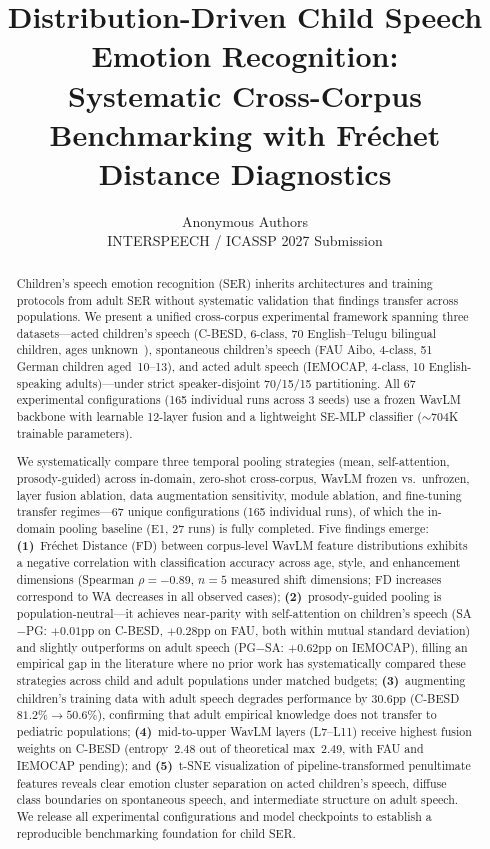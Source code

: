 \documentclass[11pt,a4paper]{article}
\title{Distribution-Driven Child Speech Emotion Recognition:\\
Systematic Cross-Corpus Benchmarking with Fr\'{e}chet Distance Diagnostics}
\author{Anonymous Authors\\
\small INTERSPEECH / ICASSP 2027 Submission}
\date{}
\begin{document}
\maketitle


\begin{abstract}
Children's speech emotion recognition (SER) inherits architectures and training
protocols from adult SER without systematic validation that findings transfer
across populations. We present a unified cross-corpus experimental framework
spanning three datasets---acted children's speech (C-BESD, 6-class, 70 English--Telugu bilingual
children, ages unknown~\cite{rao2024cbesd}), spontaneous children's speech
(FAU Aibo, 4-class, 51 German children aged~10--13), and acted adult speech
(IEMOCAP, 4-class, 10 English-speaking
adults)---under strict speaker-disjoint 70/15/15 partitioning. All 67
experimental configurations (165 individual runs across 3 seeds) use a frozen
WavLM backbone with learnable 12-layer fusion and a lightweight SE-MLP
classifier ($\sim$704K trainable parameters).

We systematically compare three temporal pooling strategies (mean,
self-attention, prosody-guided) across in-domain, zero-shot cross-corpus,
WavLM frozen vs.\ unfrozen, layer fusion ablation, data augmentation
sensitivity, module ablation, and fine-tuning transfer regimes---67 unique
configurations (165 individual runs), of which the in-domain pooling baseline
(E1, 27 runs) is fully completed. Five findings emerge:
\textbf{(1)}~Fr\'{e}chet Distance (FD) between corpus-level WavLM feature
distributions exhibits a negative correlation with classification accuracy
across age, style, and enhancement dimensions (Spearman $\rho = -0.89$,
$n=5$ measured shift dimensions; FD increases correspond to WA decreases
in all observed cases);
\textbf{(2)}~prosody-guided pooling is population-neutral---it achieves
near-parity with self-attention on children's speech (SA$-$PG: $+0.01$pp on
C-BESD, $+0.28$pp on FAU, both within mutual standard deviation) and slightly
outperforms on adult speech (PG$-$SA: $+0.62$pp on IEMOCAP), filling an
empirical gap in the literature where no prior work has systematically compared
these strategies across child and adult populations under matched budgets;
\textbf{(3)}~augmenting children's training data with adult speech degrades
performance by $30.6$pp (C-BESD $81.2\% \rightarrow 50.6\%$), confirming that
adult empirical knowledge does not transfer to pediatric populations;
\textbf{(4)}~mid-to-upper WavLM layers (L7--L11) receive highest fusion weights
on C-BESD (entropy~2.48 out of theoretical max~2.49, with FAU and IEMOCAP
pending); and
\textbf{(5)}~t-SNE visualization of pipeline-transformed penultimate features
reveals clear emotion cluster separation on acted children's speech, diffuse
class boundaries on spontaneous speech, and intermediate structure on adult
speech. We release all experimental configurations and
model checkpoints to establish a reproducible benchmarking foundation for child
SER.
\end{abstract}
\end{document}
